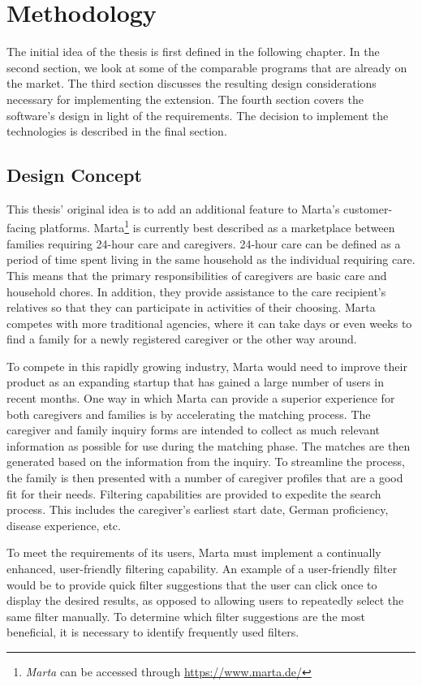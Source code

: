 \newpage
\chapter{Methodology}
The initial idea of the thesis is first defined in the following chapter. In the second section, we look at some of the comparable programs that are already on the market. The third section discusses the resulting design considerations necessary for implementing the extension. The fourth section covers the software's design in light of the requirements. The decision to implement the technologies is described in the final section.

\section{Design Concept}
This thesis' original idea is to add an additional feature to Marta's customer-facing platforms. Marta\footnote{\emph{Marta} can be accessed through \url{https://www.marta.de/}} is currently best described as a marketplace between families requiring 24-hour care and caregivers. 24-hour care can be defined as a period of time spent living in the same household as the individual requiring care. This means that the primary responsibilities of caregivers are basic care and household chores. In addition, they provide assistance to the care recipient's relatives so that they can participate in activities of their choosing. Marta competes with more traditional agencies, where it can take days or even weeks to find a family for a newly registered caregiver or the other way around.

To compete in this rapidly growing industry, Marta would need to improve their product as an expanding startup that has gained a large number of users in recent months. One way in which Marta can provide a superior experience for both caregivers and families is by accelerating the matching process. The caregiver and family inquiry forms are intended to collect as much relevant information as possible for use during the matching phase. The matches are then generated based on the information from the inquiry. To streamline the process, the family is then presented with a number of caregiver profiles that are a good fit for their needs. Filtering capabilities are provided to expedite the search process. This includes the caregiver's earliest start date, German proficiency, disease experience, etc.

To meet the requirements of its users, Marta must implement a continually enhanced, user-friendly filtering capability. An example of a user-friendly filter would be to provide quick filter suggestions that the user can click once to display the desired results, as opposed to allowing users to repeatedly select the same filter manually. To determine which filter suggestions are the most beneficial, it is necessary to identify frequently used filters.

